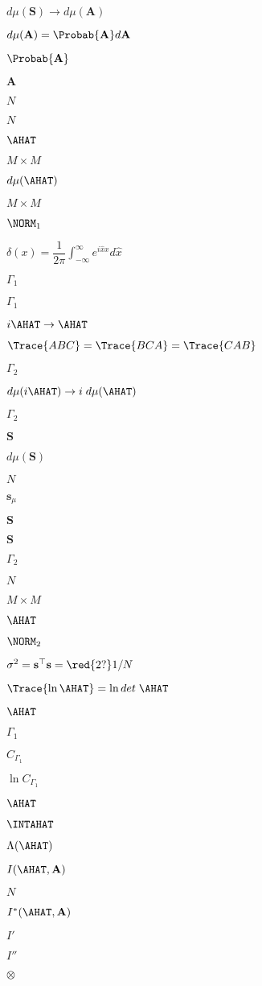 $d\mu(\mathbf{S})\rightarrow d\mu(\mathbf{A})$

$d\mu(\mathbf{A})=\Probab{\mathbf{A}}d\mathbf{A}$

$\Probab{\mathbf{A}}$

$\mathbf{A}$

$N$

$N$

$\AHAT$

$M \times M$

$d\mu(\AHAT)$

$M \times M$

$\NORM_{1}$

$\delta(x)=\dfrac{1}{2\pi}\int_{-\infty}^{\infty} e^{i\hat{x}x}d\hat{x}$

$\Gamma_1$

$\Gamma_1$

$i\AHAT\rightarrow\AHAT$

$\Trace{ABC}=\Trace{BCA}=\Trace{CAB}$

$\Gamma_2$

$d\mu(i\AHAT)\rightarrow i\;d\mu(\AHAT)$

$\Gamma_2$

$\mathbf{S}$

$d\mu(\mathbf{S})$

$N$

$\mathbf{s}_{\mu}$

$\mathbf{S}$

$\mathbf{S}$

$\Gamma_2$

$N$

$M\times M$

$\AHAT$

$\NORM_2$

$\sigma^{2}=\mathbf{s}^{\top}\mathbf{s}=\red{2?}1/N$

$ \Trace{\ln\AHAT}=\ln det\;\AHAT $

$\AHAT$

$\Gamma_1$

$C_{\Gamma_1}$

$\ln  C_{\Gamma_1}$

$\AHAT$

$\INTAHAT $

$\Lambda(\AHAT)$

$I(\AHAT,\mathbf{A})$

$N$

$I^{*}(\AHAT,\mathbf{A})$

$I'$

$I''$

$\otimes$

